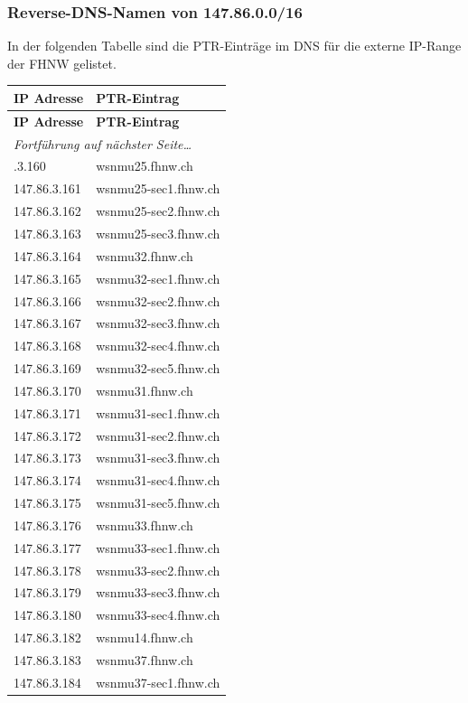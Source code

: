 \documentclass[11pt,a4paper]{scrartcl}
\begin{document}
\subsubsection{Reverse-DNS-Namen von 147.86.0.0/16}
In der folgenden Tabelle sind die PTR-Einträge im DNS für die externe IP-Range der FHNW gelistet.
\begin{longtable}{p{2.5cm}|p{7cm}}
	\textbf{IP Adresse} & \textbf{PTR-Eintrag} \\
	\endfirsthead
	\textbf{IP Adresse} & \textbf{PTR-Eintrag} \\
	\endhead
	\multicolumn{2}{l}{\textit{Fortführung auf nächster Seite\ldots}} \\
	\endfoot
	\endlastfoot
	147.86.3.160 & wsnmu25.fhnw.ch \\
	147.86.3.161 & wsnmu25-sec1.fhnw.ch \\
	147.86.3.162 & wsnmu25-sec2.fhnw.ch \\
	147.86.3.163 & wsnmu25-sec3.fhnw.ch \\
	147.86.3.164 & wsnmu32.fhnw.ch \\
	147.86.3.165 & wsnmu32-sec1.fhnw.ch \\
	147.86.3.166 & wsnmu32-sec2.fhnw.ch \\
	147.86.3.167 & wsnmu32-sec3.fhnw.ch \\
	147.86.3.168 & wsnmu32-sec4.fhnw.ch \\
	147.86.3.169 & wsnmu32-sec5.fhnw.ch \\
	147.86.3.170 & wsnmu31.fhnw.ch \\
	147.86.3.171 & wsnmu31-sec1.fhnw.ch \\
	147.86.3.172 & wsnmu31-sec2.fhnw.ch \\
	147.86.3.173 & wsnmu31-sec3.fhnw.ch \\
	147.86.3.174 & wsnmu31-sec4.fhnw.ch \\
	147.86.3.175 & wsnmu31-sec5.fhnw.ch \\
	147.86.3.176 & wsnmu33.fhnw.ch \\
	147.86.3.177 & wsnmu33-sec1.fhnw.ch \\
	147.86.3.178 & wsnmu33-sec2.fhnw.ch \\
	147.86.3.179 & wsnmu33-sec3.fhnw.ch \\
	147.86.3.180 & wsnmu33-sec4.fhnw.ch \\
	147.86.3.182 & wsnmu14.fhnw.ch \\
	147.86.3.183 & wsnmu37.fhnw.ch \\
	147.86.3.184 & wsnmu37-sec1.fhnw.ch \\

\end{longtable}
\end{document}
